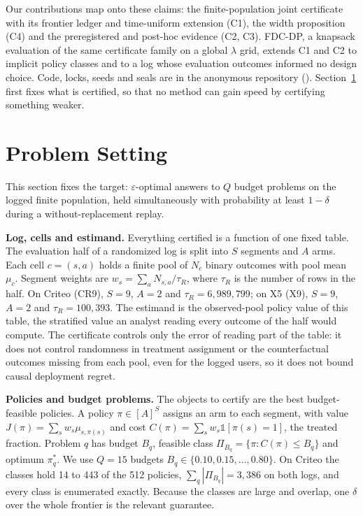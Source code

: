 \documentclass[sigconf,anonymous,review]{acmart}
\newcommand{\eps}{\varepsilon}
\begin{document}
\noindent Our contributions map onto these claims: the finite-population joint certificate with its frontier ledger and time-uniform extension (C1), the width proposition (C4) and the preregistered and post-hoc evidence (C2, C3). FDC-DP, a knapsack evaluation of the same certificate family on a global $\lambda$ grid, extends C1 and C2 to implicit policy classes and to a log whose evaluation outcomes informed no design choice. Code, locks, seeds and seals are in the anonymous repository (\anonrepo). Section~\ref{sec:setting} first fixes what is certified, so that no method can gain speed by certifying something weaker.

\section{Problem Setting}\label{sec:setting}

This section fixes the target: $\eps$-optimal answers to $Q$ budget problems on the logged finite population, held simultaneously with probability at least $1-\delta$ during a without-replacement replay.

\textbf{Log, cells and estimand.} Everything certified is a function of one fixed table. The evaluation half of a randomized log is split into $S$ segments and $A$ arms. Each cell $c = (s,a)$ holds a finite pool of $N_c$ binary outcomes with pool mean $\mu_c$. Segment weights are $w_s = \sum_a N_{s,a}/\tau_R$, where $\tau_R$ is the number of rows in the half. On Criteo (CR9), $S = 9$, $A = 2$ and $\tau_R = 6{,}989{,}799$; on X5 (X9), $S = 9$, $A = 2$ and $\tau_R = 100{,}393$. The estimand is the observed-pool policy value of this table, the stratified value an analyst reading every outcome of the half would compute. The certificate controls only the error of reading part of the table: it does not control randomness in treatment assignment or the counterfactual outcomes missing from each pool, even for the logged users, so it does not bound causal deployment regret.

\textbf{Policies and budget problems.} The objects to certify are the best budget-feasible policies. A policy $\pi \in [A]^S$ assigns an arm to each segment, with value $J(\pi) = \sum_s w_s \mu_{s,\pi(s)}$ and cost $C(\pi) = \sum_s w_s \mathbb{1}[\pi(s) = 1]$, the treated fraction. Problem $q$ has budget $B_q$, feasible class $\Pi_{B_q} = \{\pi : C(\pi) \le B_q\}$ and optimum $\pi^*_q$. We use $Q = 15$ budgets $B_q \in \{0.10, 0.15, \dots, 0.80\}$. On Criteo the classes hold 14 to 443 of the 512 policies, $\sum_q |\Pi_{B_q}| = 3{,}386$ on both logs, and every class is enumerated exactly. Because the classes are large and overlap, one $\delta$ over the whole frontier is the relevant guarantee.
\end{document}
